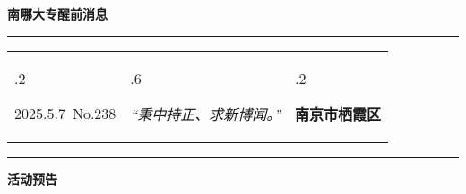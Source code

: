 \documentclass[letterpaper, 12pt]{article}
\begin{document}
\begin{center}
    \Huge\textbf{南哪大专醒前消息}
\end{center}
\vspace{4mm}
\hrule
\renewcommand\tabularxcolumn[1]{m{#1}}
\begin{tabularx}{\textwidth}{>{\hsize.2\hsize}X>{\hsize.6\hsize}X>{\hsize.2\hsize}X}
    \begin{flushleft}
        2025.5.7\, No.238
    \end{flushleft}
    &
    \begin{center}
        \textit{“秉中持正、求新博闻。”}
    \end{center}
    &
    \begin{flushright}
        \textbf{南京市栖霞区}
    \end{flushright}
\end{tabularx}
\vspace{-3.5mm}
\hrule
\vspace{4mm}
\centerline{\huge\textbf{活动预告}}
\end{document}
